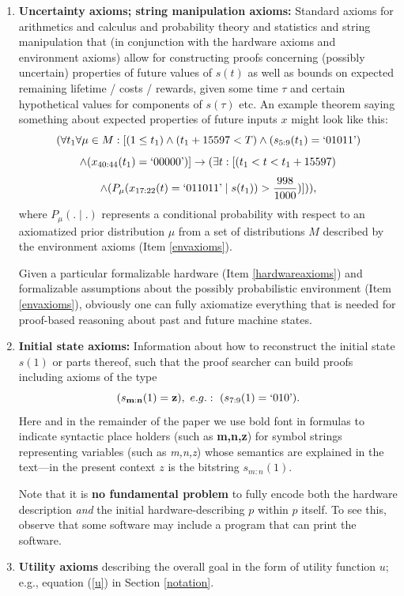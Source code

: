 \begin{enumerate}
\begin{enumerate}
\item
{\bf Uncertainty axioms; string manipulation axioms:}
\label{probaxioms}
Standard axioms for arithmetics and calculus 
and probability theory \cite{Kolmogorov:33} 
and statistics 
and string manipulation that (in conjunction
with the hardware axioms and environment axioms) allow for constructing proofs 
concerning (possibly uncertain) properties of future values of 
$s(t)$ as well as bounds on expected remaining lifetime /
costs / rewards,  
given some time $\tau$ and certain 
hypothetical values for components of $s(\tau)$ etc. 
An example theorem saying something about
expected properties of future inputs $x$ might look like this:
\[
(\forall t_1 \forall \mu \in M:
[(1 \leq t_1) \wedge
(t_1 + 15597 < T) \wedge
(s_{5:9}(t_1) = `01011\textrm{'})
\]
\[
\wedge (x_{40:44}(t_1)=`00000\textrm{'}) ]
\rightarrow
(\exists t: [(t_1 < t < t_1 + 15597)  
\]
\[
\wedge
(P_{\mu}(x_{17:22}(t) = `011011\textrm{'} \mid s(t_1)) > \frac{998}{1000} )])),
\]
where $P_{\mu}(. \mid . )$ represents a conditional probability
with respect to an axiomatized prior distribution $\mu$ from
a set of distributions $M$ described by
the environment axioms (Item \ref{envaxioms}).

Given a particular 
formalizable hardware 
(Item \ref{hardwareaxioms})
and formalizable assumptions about the 
possibly probabilistic environment
(Item \ref{envaxioms}),
obviously one can fully axiomatize 
everything that is needed for 
proof-based reasoning about past and future machine states.

\item
\label{initaxioms}
{\bf Initial state axioms:}
Information about how
to reconstruct the initial state $s(1)$ or parts thereof,
such that the proof searcher 
can build proofs including
axioms of the type
\[
(s_{{\bf m}:{\bf n}}(1)={\bf z}),
~e.g.:~ (s_{7:9}(1)=`010\textrm{'}).
\]
Here and in the remainder of the paper 
we use bold font in formulas to indicate 
syntactic place holders (such as {\bf m,n,z})
for symbol strings representing 
variables (such as {\em m,n,z})
whose semantics are explained in 
the text---in the present context $z$ is the 
bitstring $s_{m:n}(1)$.

Note that it is {\bf no fundamental problem} to fully encode
both the hardware description {\em and} the initial
hardware-describing $p$ within $p$
itself. To see this, observe that some software may 
include a program that can print the software.


\item
{\bf Utility axioms}
\label{itemu}
describing the overall goal
in the form of utility function $u$; e.g., equation (\ref{u}) in
Section \ref{notation}.
\end{enumerate}


\end{enumerate}
